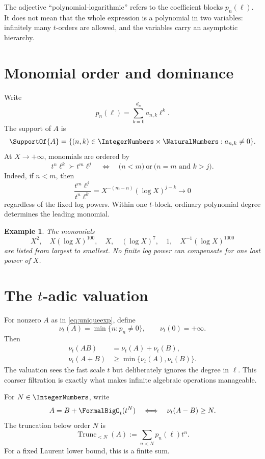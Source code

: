 \documentclass[11pt,oneside,openany]{book}
\newtheorem{example}[theorem]{Example}
\newcommand{\ordt}{\nu_t}
\newcommand{\TransseriesTruncateBelow}[2]{%
  \operatorname{Trunc}_{<#2}\!\left(#1\right)%
}
\begin{document}
The adjective ``polynomial-logarithmic'' refers to the coefficient blocks
\(p_n(\ell)\).  It does not mean that the whole expression is a polynomial in
two variables: infinitely many \(t\)-orders are allowed, and the variables
carry an asymptotic hierarchy.

\section{Monomial order and dominance}
Write
\[
  p_n(\ell)=\sum_{k=0}^{d_n}a_{n,k}\ell^k.
\]
The support of \(A\) is
\[
  \SupportOf{A}=\{(n,k)\in\IntegerNumbers\times\NaturalNumbers:a_{n,k}\neq0\}.
\]
At \(X\to+\infty\), monomials are ordered by
\begin{equation}\label{eq:domorder}
 t^n\ell^k\succ t^m\ell^j
 \quad\Longleftrightarrow\quad
 \bigl(n<m\bigr)
 \ \text{or}\ 
 \bigl(n=m\text{ and }k>j\bigr).
\end{equation}
Indeed, if \(n<m\), then
\[
 \frac{t^m\ell^j}{t^n\ell^k}
 =X^{-(m-n)}(\log X)^{j-k}\longrightarrow0
\]
regardless of the fixed log powers.  Within one \(t\)-block, ordinary
polynomial degree determines the leading monomial.

\begin{example}
The monomials
\[
  X^2,
  \quad X(\log X)^{100},
  \quad X,
  \quad (\log X)^7,
  \quad 1,
  \quad X^{-1}(\log X)^{1000}
\]
are listed from largest to smallest.  No finite log power can compensate for
one lost power of \(X\).
\end{example}

\section{The \texorpdfstring{\(t\)}{t}-adic valuation}
For nonzero \(A\) as in \cref{eq:uniqueexp}, define
\begin{equation}\label{eq:valuation}
  \ordt(A)=\min\{n:p_n\neq0\},
  \qquad
  \ordt(0)=+\infty.
\end{equation}
Then
\begin{align}
 \ordt(AB)&=\ordt(A)+\ordt(B),\label{eq:valprod}\\
 \ordt(A+B)&\geq\min\{\ordt(A),\ordt(B)\}.
 \label{eq:valsum}
\end{align}
The valuation sees the fast scale \(t\) but deliberately ignores the degree in
\(\ell\).  This coarser filtration is exactly what makes infinite algebraic
operations manageable.

For \(N\in\IntegerNumbers\), write
\[
  A=B+\FormalBigO_t(t^N)
  \quad\Longleftrightarrow\quad
  \ordt(A-B)\geq N.
\]
The truncation below order \(N\) is
\begin{equation}\label{eq:truncdef}
  \TransseriesTruncateBelow{A}{N}:=\sum_{n<N}p_n(\ell)t^n.
\end{equation}
For a fixed Laurent lower bound, this is a finite sum.
\end{document}
